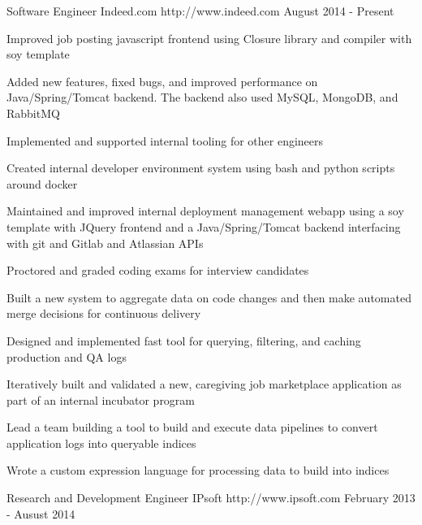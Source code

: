 \documentclass[11pt, a4paper]{awesome-cv}
\begin{document}
\makecvheader

\begin{cventries}
  \cventry
    {Software Engineer}
    {Indeed.com}
    {http://www.indeed.com}
    {August 2014 - Present}
    {
      \begin{cvitems}
        \item {Improved job posting javascript frontend using Closure library and compiler with soy template}\item {Added new features, fixed bugs, and improved performance on Java/Spring/Tomcat backend. The backend also used MySQL, MongoDB, and RabbitMQ}\item {Implemented and supported internal tooling for other engineers}\item {Created internal developer environment system using bash and python scripts around docker}\item {Maintained and improved internal deployment management webapp using a soy template with JQuery frontend and a Java/Spring/Tomcat backend interfacing with git and Gitlab and Atlassian APIs}\item {Proctored and graded coding exams for interview candidates}\item {Built a new system to aggregate data on code changes and then make automated merge decisions for continuous delivery}\item {Designed and implemented fast tool for querying, filtering, and caching production and QA logs}\item {Iteratively built and validated a new, caregiving job marketplace application as part of an internal incubator program}\item {Lead a team building a tool to build and execute data pipelines to convert application logs into queryable indices}\item {Wrote a custom expression language for processing data to build into indices}
      \end{cvitems}
    }
  \cventry
    {Research and Development Engineer}
    {IPsoft}
    {http://www.ipsoft.com}
    {February 2013 - Ausust 2014}
    {
      \begin{cvitems}

\end{cvitems}}
\end{cventries}
\end{document}
